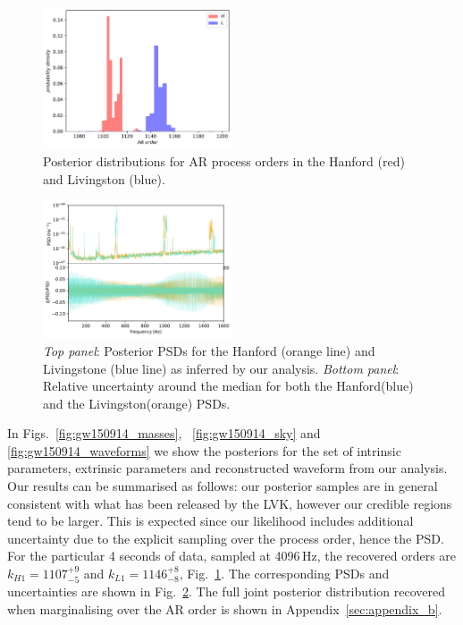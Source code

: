 \documentclass[epj,nopacs]{svjour}
\begin{document}
\begin{figure}
	\caption{Posterior distributions for AR process orders in the Hanford (red) and Livingston (blue).}
	\label{fig:gw150914_orders}
	\includegraphics[width=0.5\textwidth,keepaspectratio]{Images/gw150914/orders.pdf}
\end{figure}

\begin{figure}
	\caption{\emph{Top panel}: Posterior PSDs for the Hanford (orange line) and Livingstone (blue line) as inferred by our analysis. \emph{Bottom panel}: Relative uncertainty around the median for both the Hanford(blue) and the Livingston(orange) PSDs.}
	\label{fig:gw150914_psds}
	\includegraphics[width=0.5\textwidth,keepaspectratio]{Images/gw150914/posterior_psds.pdf}
\end{figure}

In Figs.~\ref{fig:gw150914_masses}, ~\ref{fig:gw150914_sky} and \ref{fig:gw150914_waveforms} we show the posteriors for the set of intrinsic parameters, extrinsic parameters and reconstructed waveform from our analysis. Our results can be summarised as follows: our posterior samples are in general consistent with what has been released by the LVK, however our credible regions tend to be larger. This is expected since our likelihood includes additional uncertainty due to the explicit sampling over the process order, hence the PSD. For the particular 4 seconds of data, sampled at 4096\,Hz, the recovered orders are $k_{H1} = 1107_{-5}^{+9}$ and $k_{L1} = 1146_{-8}^{+8}$, Fig.~\ref{fig:gw150914_orders}. The corresponding PSDs and uncertainties are shown in Fig.~\ref{fig:gw150914_psds}. The full joint posterior distribution recovered when marginalising over the AR order is shown in Appendix~\ref{sec:appendix_b}.
\end{document}

